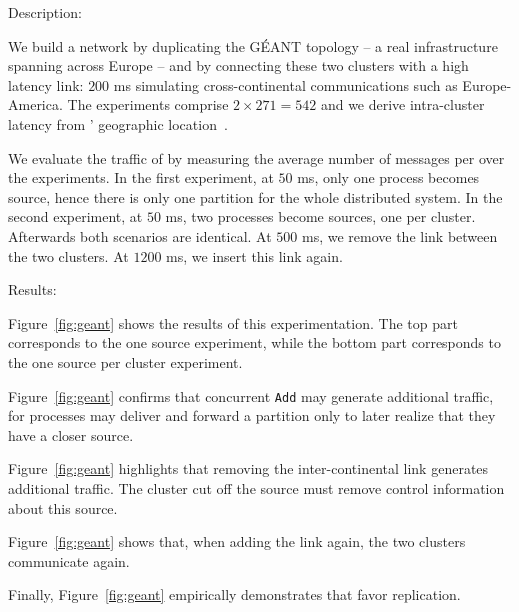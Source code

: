 \begin{asparadesc}
\item [Description:]

We build a network by duplicating the G{\'E}ANT topology -- a real
infrastructure spanning across Europe -- and by connecting these two
clusters with a high latency link: $200$ ms simulating
cross-continental communications such as Europe-America. The
experiments comprise $2 \times 271 = 542$ \processes and we derive
intra-cluster latency from \processes' geographic location~\REF.

\noindent We evaluate the traffic of \NAME by measuring the average
number of messages per \process over the experiments. In the first
experiment, at $50$ ms, only one process becomes source, hence there
is only one partition for the whole distributed system. In the second
experiment, at $50$ ms, two processes become sources, one per
cluster. Afterwards both scenarios are identical. At $500$ ms, we
remove the link between the two clusters. At $1200$ ms, we insert this
link again.

\item [Results:]

Figure~\ref{fig:geant} shows the results of this experimentation. The
top part corresponds to the one source experiment, while the bottom
part corresponds to the one source per cluster experiment.

\noindent Figure~\ref{fig:geant} confirms that concurrent \texttt{Add}
may generate additional traffic, for processes may deliver and forward
a partition only to later realize that they have a closer source.

\noindent Figure~\ref{fig:geant} highlights that removing the
inter-continental link generates additional traffic. The cluster cut
off the source must remove control information about this
source.   

\noindent Figure~\ref{fig:geant} shows that, when adding the link
again, the two clusters communicate again. 

\noindent Finally, Figure~\ref{fig:geant}  empirically demonstrates that \NAME favor
replication. 
\end{asparadesc}



